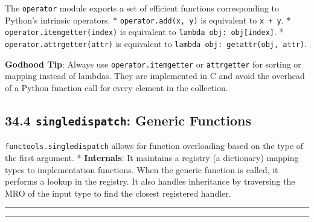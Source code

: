 The \passthrough{\lstinline!operator!} module exports a set of efficient
functions corresponding to Python's intrinsic operators. *
\passthrough{\lstinline!operator.add(x, y)!} is equivalent to
\passthrough{\lstinline!x + y!}. *
\passthrough{\lstinline!operator.itemgetter(index)!} is equivalent to
\passthrough{\lstinline!lambda obj: obj[index]!}. *
\passthrough{\lstinline!operator.attrgetter(attr)!} is equivalent to
\passthrough{\lstinline!lambda obj: getattr(obj, attr)!}.

\textbf{Godhood Tip}: Always use
\passthrough{\lstinline!operator.itemgetter!} or
\passthrough{\lstinline!attrgetter!} for sorting or mapping instead of
lambdas. They are implemented in C and avoid the overhead of a Python
function call for every element in the collection.

\hypertarget{singledispatch-generic-functions}{%
\subsection{\texorpdfstring{34.4 \texttt{singledispatch}: Generic
Functions}{34.4 singledispatch: Generic Functions}}\label{singledispatch-generic-functions}}

\passthrough{\lstinline!functools.singledispatch!} allows for function
overloading based on the type of the first argument. *
\textbf{Internals}: It maintains a registry (a dictionary) mapping types
to implementation functions. When the generic function is called, it
performs a lookup in the registry. It also handles inheritance by
traversing the MRO of the input type to find the closest registered
handler.

\begin{center}\rule{0.5\linewidth}{0.5pt}\end{center}

\begin{center}\rule{0.5\linewidth}{0.5pt}\end{center}
